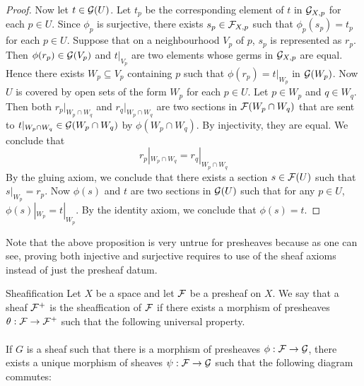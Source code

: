\documentclass[a4paper]{article}
\begin{document}
\begin{prp}{}{}
\begin{proof}
Now let $t\in\mathcal{G}(U)$. Let $t_p$ be the corresponding element of $t$ in $\mathcal{G}_{X,p}$ for each $p\in U$. Since $\phi_p$ is surjective, there exists $s_p\in\mathcal{F}_{X,p}$ such that $\phi_p(s_p)=t_p$ for each $p\in U$. Suppose that on a neighbourhood $V_p$ of $p$, $s_p$ is represented as $r_p$. Then $\phi(r_p)\in\mathcal{G}(V_p)$ and $t|_{V_p}$ are two elements whose germs in $\mathcal{G}_{X,p}$ are equal. Hence there exists $W_p\subseteq V_p$ containing $p$ such that $\phi(r_p)=t|_{W_p}$ in $\mathcal{G}(W_p)$. Now $U$ is covered by open sets of the form $W_p$ for each $p\in U$. Let $p\in W_p$ and $q\in W_q$. Then both $r_p|_{W_p\cap W_q}$ and $r_q|_{W_p\cap W_q}$ are two sections in $\mathcal{F}(W_p\cap W_q)$ that are sent to $t|_{W_p\cap W_q}\in\mathcal{G}(W_p\cap W_q)$ by $\phi(W_p\cap W_q)$. By injectivity, they are equal. We conclude that $$r_p|_{W_p\cap W_q}=r_q|_{W_p\cap W_q}$$ By the gluing axiom, we conclude that there exists a section $s\in\mathcal{F}(U)$ such that $s|_{W_p}=r_p$. Now $\phi(s)$ and $t$ are two sections in $\mathcal{G}(U)$ such that for any $p\in U$, $\phi(s)|_{W_p}=t|_{W_p}$. By the identity axiom, we conclude that $\phi(s)=t$. 
\end{proof}
\end{prp}

Note that the above proposition is very untrue for presheaves because as one can see, proving both injective and surjective requires to use of the sheaf axioms instead of just the presheaf datum. 

\begin{defn}{Sheafification}{} Let $X$ be a space and let $\mathcal{F}$ be a presheaf on $X$. We say that a sheaf $\mathcal{F}^+$ is the sheaffication of $\mathcal{F}$ if there exists a morphism of presheaves $\theta:\mathcal{F}\to\mathcal{F}^+$ such that the following universal property. \\~\\

If $G$ is a sheaf such that there is a morphism of presheaves $\phi:\mathcal{F}\to\mathcal{G}$, there exists a unique morphism of sheaves $\psi:\mathcal{F}\to\mathcal{G}$ such that the following diagram commutes: \\~\\
\end{defn}
\end{document}
